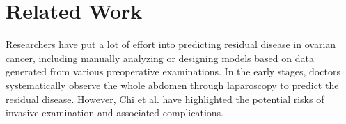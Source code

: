 \section{Related Work}
\label{s:related_work}

Researchers have put a lot of effort into predicting residual disease in ovarian cancer\cite{chi2006optimal, ferrandina2009role, shim2015nomogram}, including manually analyzing or designing models based on data generated from various preoperative examinations.
In the early stages, doctors systematically observe the whole abdomen through laparoscopy to predict the residual disease\cite{testa2012ultrasound, van2019laparoscopy}. However, Chi et al.\cite{chi2004ten} have highlighted the potential risks of invasive examination and associated complications.


